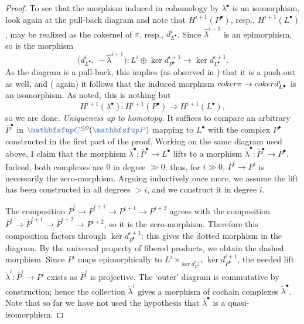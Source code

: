 \begin{proof}
  To see that the morphism induced in cohomology by $\lambda^\bullet$
  is an isomorphism, look again at the pull-back diagram and note that
  $H^{i+1}(P^\bullet)$, resp., $H^{i+1}(L^\bullet)$, may be realized
  as the cokernel of $\pi$, resp., $d^i_{L^\bullet}$. Since
  $\hat\lambda^{i+1}$ is an epimorphism, so is the morphism
  \[
    \bigl(d^i_{L^\bullet},\, -\hat\lambda^{i+1}\bigr) : L^i \oplus
    \ker d^{i+1}_{P^\bullet} \longrightarrow \ker d^{i+1}_{L^\bullet}.
  \]
  As the diagram is a pull-back, this implies (as observed in
  ) that it is a push-out as well, and
  ( again) it follows
  that the induced morphism $coker\pi \to coker d^i_{L^\bullet}$ is
  an isomorphism. As noted, this is nothing but
  \[
    H^{i+1}(\lambda^\bullet) : H^{i+1}(P^\bullet) \longrightarrow
    H^{i+1}(L^\bullet),
  \]
  so we are done.  \emph{Uniqueness up to homotopy.} It suffices to
  compare an arbitrary $\overline{P}^\bullet$ in
  $\categ{C}^{\le 0}(\categ{P})$ mapping to $L^\bullet$ with the
  complex $P^\bullet$ constructed in the first part of the
  proof. Working on the same diagram used above,
  I claim that the morphism
  $\overline\lambda^\bullet : \overline P^\bullet \to L^\bullet$ lifts
  to a morphism
  $\tilde\lambda^\bullet : \overline P^\bullet \to P^\bullet$. Indeed,
  both complexes are $0$ in degree $\gg 0$; thus, for $i \gg 0$,
  $\overline P^i \to P^i$ is necessarily the zero-morphism. Arguing
  inductively once more, we assume the lift has been constructed in
  all degrees $> i$, and we construct it in degree $i$.

  The composition
  $\overline P^i \to \overline P^{i+1} \to P^{i+1} \to P^{i+2}$ agrees
  with the composition
  $\overline P^i \to \overline P^{i+1} \to \overline P^{i+2} \to
  P^{i+2}$, so it is the zero-morphism. Therefore this composition
  factors through $\ker d^{i+1}_{P^\bullet}$: this gives the dotted
  morphism in the diagram. By the universal property of fibered
  products, we obtain the dashed morphism. Since $P^i$ maps
  epimorphically to
  $L^i \times_{\ker d^{i+1}_{L^\bullet}} \ker d^{i+1}_{P^\bullet}$,
  the needed lift $\tilde\lambda^i : \overline P^i \to P^i$ exists as
  $\overline P^i$ is projective. The `outer' diagram is commutative by
  construction; hence the collection $\tilde\lambda^i$ gives a
  morphism of cochain complexes $\tilde\lambda^\bullet$. Note that so
  far we have not used the hypothesis that $\overline\lambda^\bullet$
  is a quasi-isomorphism.


\end{proof}
